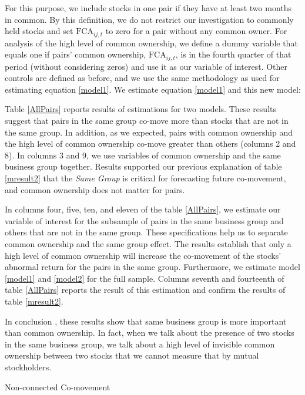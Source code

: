 \documentclass[12pt, a4paper]{article}
\begin{document}
For this purpose, we include stocks in one pair if they have at least two months in common. By this definition, we do not restrict our investigation to commonly held stocks and set $\text{FCA}_{ij,t}$ to zero for a pair without any common owner. For analysis of the high level of common ownership, we define a dummy variable that equals one if pairs' common ownership, $\text{FCA}_{ij,t}$, is in the fourth quarter of that period (without considering zeros) and use it as our variable of interest. Other controls are defined as before, and we use the same methodology as used for estimating equation \ref{model1}. We estimate equation \ref{model1} and this new model:


Table \ref{AllPairs} reports results of estimations for two models. These results suggest that pairs in the same group co-move more than stocks that are not in the same group. In addition, as we expected, pairs with common ownership and the high level of common ownership co-move greater than others (columns 2 and 8). In columns 3 and 9, we use variables of common ownership and the same business group together. Results supported our previous explanation of table \ref{mresult2} that the \textit{Same Group} is critical for forecasting future co-movement, and common ownership does not matter for pairs. 

In columns four, five, ten, and eleven of the table \ref{AllPairs},  we estimate our variable of interest for the subsample of pairs in the same business group and others that are not in the same group. These specifications help us to separate common ownership and the same group effect. The results establish that only a high level of common ownership will increase the co-movement of the stocks' abnormal return for the pairs in the same group. Furthermore, we estimate model \ref{model1} and \ref{model2} for the full sample. Columns seventh and fourteenth of table \ref{AllPairs} reports the result of this estimation and confirm the results of table \ref{mresult2}. 

In conclusion , these results show that same business group is more important than common ownership. In fact, when we talk about the presence of two stocks in the same business group, we talk about a high level of invisible common ownership between two stocks that we cannot measure that by mutual stockholders.
\begin{landscape}
		\begin{table}[htbp]
	\caption{Non-connected Co-movement}
	\label{AllPairs}
	\resizebox{1.7\textwidth}{!}{
		
	}
\end{table}
\end{landscape}
\end{document}
